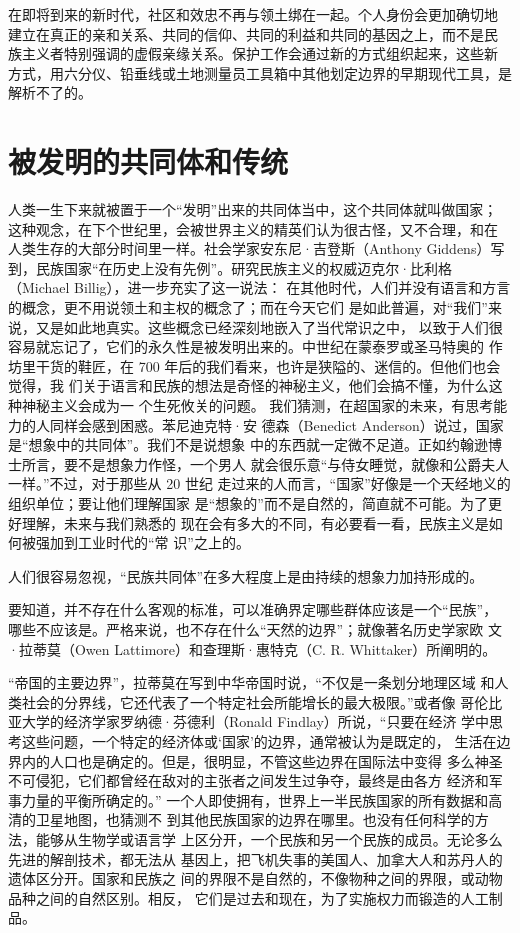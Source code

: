 在即将到来的新时代，社区和效忠不再与领土绑在一起。个人身份会更加确切地  建立在真正的亲和关系、共同的信仰、共同的利益和共同的基因之上，而不是民 族主义者特别强调的虚假亲缘关系。保护工作会通过新的方式组织起来，这些新 方式，用六分仪、铅垂线或土地测量员工具箱中其他划定边界的早期现代工具，是解析不了的。

\section{被发明的共同体和传统}

人类一生下来就被置于一个“发明”出来的共同体当中，这个共同体就叫做国家； 这种观念，在下个世纪里，会被世界主义的精英们认为很古怪，又不合理，和在 人类生存的大部分时间里一样。社会学家安东尼·吉登斯（Anthony Giddens）写 到，民族国家“在历史上没有先例”。研究民族主义的权威迈克尔·比利格（Michael Billig），进一步充实了这一说法： 在其他时代，人们并没有语言和方言的概念，更不用说领土和主权的概念了；而在今天它们 是如此普遍，对“我们”来说，又是如此地真实。这些概念已经深刻地嵌入了当代常识之中， 以致于人们很容易就忘记了，它们的永久性是被发明出来的。中世纪在蒙泰罗或圣马特奥的 作坊里干货的鞋匠，在 700 年后的我们看来，也许是狭隘的、迷信的。但他们也会觉得，我 们关于语言和民族的想法是奇怪的神秘主义，他们会搞不懂，为什么这种神秘主义会成为一 个生死攸关的问题。 我们猜测，在超国家的未来，有思考能力的人同样会感到困惑。苯尼迪克特·安 德森（Benedict Anderson）说过，国家是“想象中的共同体”。我们不是说想象 中的东西就一定微不足道。正如约翰逊博士所言，要不是想象力作怪，一个男人 就会很乐意“与侍女睡觉，就像和公爵夫人一样。”不过，对于那些从 20 世纪 走过来的人而言，“国家”好像是一个天经地义的组织单位；要让他们理解国家 是“想象的”而不是自然的，简直就不可能。为了更好理解，未来与我们熟悉的  现在会有多大的不同，有必要看一看，民族主义是如何被强加到工业时代的“常 识”之上的。

人们很容易忽视，“民族共同体”在多大程度上是由持续的想象力加持形成的。

要知道，并不存在什么客观的标准，可以准确界定哪些群体应该是一个“民族”， 哪些不应该是。严格来说，也不存在什么“天然的边界”；就像著名历史学家欧 文·拉蒂莫（Owen Lattimore）和查理斯·惠特克（C. R. Whittaker）所阐明的。

“帝国的主要边界”，拉蒂莫在写到中华帝国时说，“不仅是一条划分地理区域 和人类社会的分界线，它还代表了一个特定社会所能增长的最大极限。”或者像 哥伦比亚大学的经济学家罗纳德·芬德利（Ronald Findlay）所说，“只要在经济 学中思考这些问题，一个特定的经济体或‘国家’的边界，通常被认为是既定的， 生活在边界内的人口也是确定的。但是，很明显，不管这些边界在国际法中变得 多么神圣不可侵犯，它们都曾经在敌对的主张者之间发生过争夺，最终是由各方 经济和军事力量的平衡所确定的。” 一个人即使拥有，世界上一半民族国家的所有数据和高清的卫星地图，也猜测不 到其他民族国家的边界在哪里。也没有任何科学的方法，能够从生物学或语言学 上区分开，一个民族和另一个民族的成员。无论多么先进的解剖技术，都无法从 基因上，把飞机失事的美国人、加拿大人和苏丹人的遗体区分开。国家和民族之 间的界限不是自然的，不像物种之间的界限，或动物品种之间的自然区别。相反， 它们是过去和现在，为了实施权力而锻造的人工制品。

